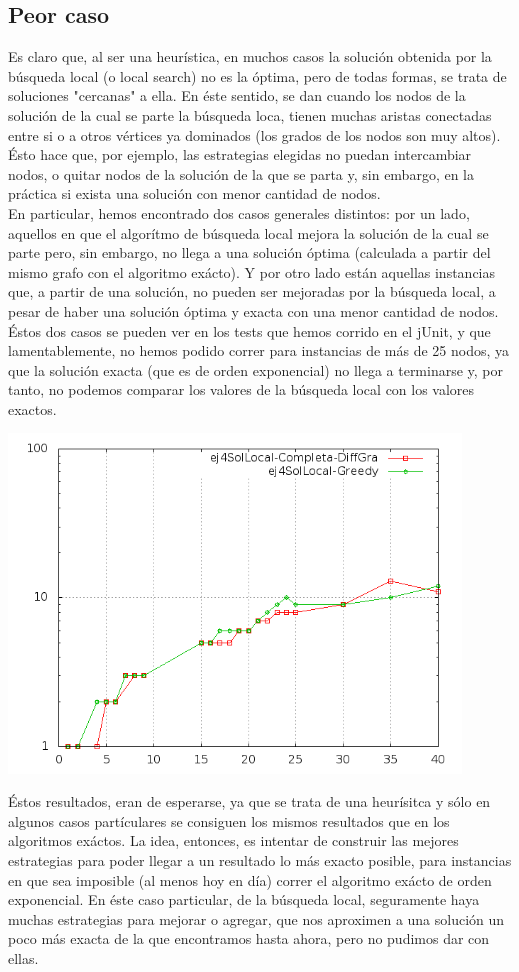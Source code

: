  \subsection{Peor caso}
 Es claro que, al ser una heurística, en muchos casos la solución obtenida por la búsqueda local (o local search) no es la óptima, pero de todas formas, se trata de soluciones "cercanas" a ella. En éste sentido, se dan cuando los nodos de la solución de la cual se parte la búsqueda loca, tienen muchas aristas conectadas entre si o a otros vértices ya dominados (los grados de los nodos son muy altos). Ésto hace que, por ejemplo, las estrategias elegidas no puedan intercambiar nodos, o quitar nodos de la solución de la que se parta y, sin embargo, en la práctica si exista una solución con menor cantidad de nodos. \\
En particular, hemos encontrado dos casos generales distintos: por un lado, aquellos en que el algorítmo de búsqueda local mejora la solución de la cual se parte pero, sin embargo, no llega a una solución óptima (calculada a partir del mismo grafo con el algoritmo exácto). Y por otro lado están aquellas instancias que, a partir de una solución, no pueden ser mejoradas por la búsqueda local, a pesar de haber una solución óptima y exacta con una menor cantidad de nodos. Éstos dos casos se pueden ver en los tests que hemos corrido en el jUnit, y que lamentablemente, no hemos podido correr para instancias de más de 25 nodos, ya que la solución exacta (que es de orden exponencial) no llega a terminarse y, por tanto, no podemos comparar los valores de la búsqueda local con los valores exactos. \\
\begin{center}
\includegraphics[width=12cm]{./graficos/comparacionSolucionPasadaLocal.png}
\end{center}
Éstos resultados, eran de esperarse, ya que se trata de una heurísitca y sólo en algunos casos partículares se consiguen los mismos resultados que en los algoritmos exáctos. La idea, entonces, es intentar de construir las mejores estrategias para poder llegar a un resultado lo más exacto posible, para instancias en que sea imposible (al menos hoy en día) correr el algoritmo exácto de orden exponencial. En éste caso particular, de la búsqueda local, seguramente haya muchas estrategias para mejorar o agregar, que nos aproximen a una solución un poco más exacta de la que encontramos hasta ahora, pero no pudimos dar con ellas.


